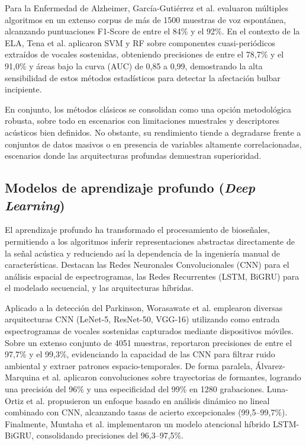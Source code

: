 Para la Enfermedad de Alzheimer, García-Gutiérrez et al. \cite{garcia-gutierrezUnveilingSoundCognitive2024} evaluaron múltiples algoritmos en un extenso corpus de más de 1500 muestras de voz espontánea, alcanzando puntuaciones F1-Score de entre el 84\% y el 92\%. En el contexto de la ELA, Tena et al. \cite{tenaALS} aplicaron SVM y RF sobre componentes cuasi-periódicos extraídos de vocales sostenidas, obteniendo precisiones de entre el 78,7\% y el 91,0\% y áreas bajo la curva (AUC) de 0,85 a 0,99, demostrando la alta sensibilidad de estos métodos estadísticos para detectar la afectación bulbar incipiente.

En conjunto, los métodos clásicos se consolidan como una opción metodológica robusta, sobre todo en escenarios con limitaciones muestrales y descriptores acústicos bien definidos. No obstante, su rendimiento tiende a degradarse frente a conjuntos de datos masivos o en presencia de variables altamente correlacionadas, escenarios donde las arquitecturas profundas demuestran superioridad.

\subsection{Modelos de aprendizaje profundo (\textit{Deep Learning})}

El aprendizaje profundo ha transformado el procesamiento de bioseñales, permitiendo a los algoritmos inferir representaciones abstractas directamente de la señal acústica y reduciendo así la dependencia de la ingeniería manual de características. Destacan las Redes Neuronales Convolucionales (CNN) para el análisis espacial de espectrogramas, las Redes Recurrentes (LSTM, BiGRU) para el modelado secuencial, y las arquitecturas híbridas.

Aplicado a la detección del Parkinson, Worasawate et al. \cite{worasawate2021} emplearon diversas arquitecturas CNN (LeNet-5, ResNet-50, VGG-16) utilizando como entrada espectrogramas de vocales sostenidas capturados mediante dispositivos móviles. Sobre un extenso conjunto de 4051 muestras, reportaron precisiones de entre el 97,7\% y el 99,3\%, evidenciando la capacidad de las CNN para filtrar ruido ambiental y extraer patrones espacio-temporales. De forma paralela, Álvarez-Marquina et al. \cite{alvarez2022} aplicaron convoluciones sobre trayectorias de formantes, logrando una precisión del 96\% y una especificidad del 99\% en 1280 grabaciones. Luna-Ortiz et al. \cite{luna2023} propusieron un enfoque basado en análisis dinámico no lineal combinado con CNN, alcanzando tasas de acierto excepcionales (99,5--99,7\%). Finalmente, Muntaha et al. \cite{muntaha2024} implementaron un modelo atencional híbrido LSTM-BiGRU, consolidando precisiones del 96,3--97,5\%.

